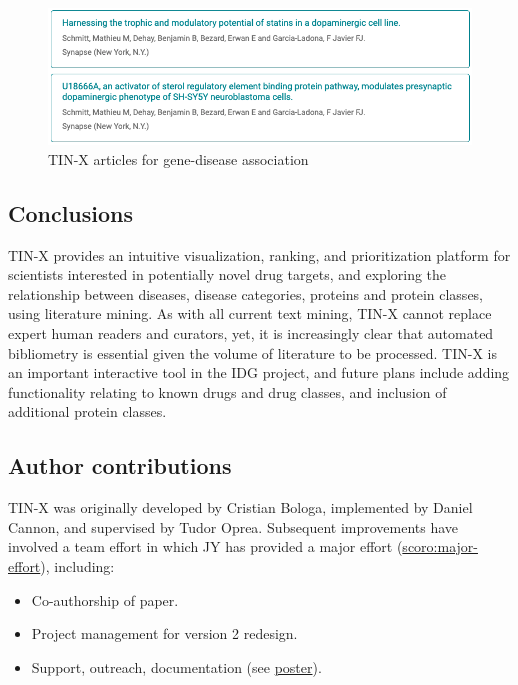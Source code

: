 \begin{figure}
    \centering
    \includegraphics[width=\linewidth]{figures/tinx/TINX_SYNRG3articles_rev2.png}
    \caption{TIN-X articles for gene-disease association}
    \label{fig:tinx_02}
\end{figure}

\subsection{Conclusions}

TIN-X provides an intuitive visualization, ranking, and prioritization platform for scientists interested in potentially novel drug targets, and exploring the relationship between diseases, disease categories, proteins and protein classes, using literature mining.  As with all current text mining, TIN-X cannot replace expert human readers and curators, yet, it is increasingly clear that automated bibliometry is essential given the volume of literature to be processed.  TIN-X is an important interactive tool in the IDG project, and future plans include adding functionality relating to known drugs and drug classes, and inclusion of additional protein classes. 

\subsection{Author contributions}

TIN-X was originally developed by Cristian Bologa, implemented by Daniel Cannon, and supervised by Tudor Oprea. Subsequent improvements have involved a team effort in which JY has provided a major effort (\href{http://purl.org/spar/scoro/major-effort}{scoro:major-effort}), including:

\begin{itemize}
    \item Co-authorship of paper.
    \item Project management for version 2 redesign.
    \item Support, outreach, documentation (see \href{https://zenodo.org/record/5038628}{poster}).
\end{itemize}
